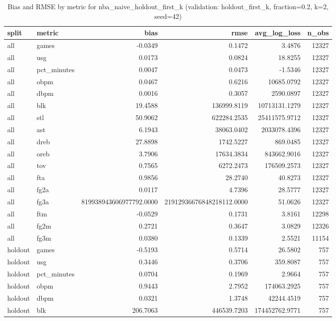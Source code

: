 \begin{table}
\caption{Bias and RMSE by metric for nba_naive_holdout_first_k (validation: holdout_first_k, fraction=0.2, k=2, seed=42)}
\label{tab:nba_naive_holdout_first_k_vs_holdout_first_k_f20_k2_s42_bias_rmse}
\begin{tabular}{llrrrr}
\toprule
split & metric & bias & rmse & avg\_log\_loss & n\_obs \\
\midrule
all & games & -0.0349 & 0.1472 & 3.4876 & 12327 \\
all & usg & 0.0173 & 0.0824 & 18.8255 & 12327 \\
all & pct\_minutes & 0.0047 & 0.0473 & -1.5346 & 12327 \\
all & obpm & 0.0467 & 0.6216 & 10685.0792 & 12327 \\
all & dbpm & 0.0016 & 0.3057 & 2590.0897 & 12327 \\
all & blk & 19.4588 & 136999.8119 & 10713131.1279 & 12327 \\
all & stl & 50.9062 & 622284.2535 & 25411575.9712 & 12327 \\
all & ast & 6.1943 & 38063.0402 & 2033078.4396 & 12327 \\
all & dreb & 27.8898 & 1742.5227 & 869.0485 & 12327 \\
all & oreb & 3.7906 & 17634.3834 & 843662.9016 & 12327 \\
all & tov & 0.7565 & 6272.2473 & 176509.2573 & 12327 \\
all & fta & 0.9856 & 28.2740 & 40.8273 & 12327 \\
all & fg2a & 0.0117 & 4.7396 & 28.5777 & 12327 \\
all & fg3a & 819938943606977792.0000 & 21912936676848218112.0000 & 51.0626 & 12327 \\
all & ftm & -0.0529 & 0.1731 & 3.8161 & 12298 \\
all & fg2m & 0.2721 & 0.3647 & 3.0829 & 12326 \\
all & fg3m & 0.0380 & 0.1339 & 2.5521 & 11154 \\
holdout & games & -0.5193 & 0.5714 & 26.5802 & 757 \\
holdout & usg & 0.3446 & 0.3706 & 359.8087 & 757 \\
holdout & pct\_minutes & 0.0704 & 0.1969 & 2.9664 & 757 \\
holdout & obpm & 0.9443 & 2.7952 & 174063.2925 & 757 \\
holdout & dbpm & 0.0321 & 1.3748 & 42244.4519 & 757 \\
holdout & blk & 206.7063 & 446539.7203 & 174452762.9771 & 757 \\

\end{tabular}
\end{table}
